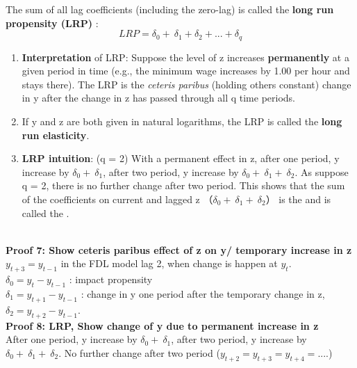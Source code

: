 \documentclass[12pt]{article}
\begin{document}
\noindent
The sum of all lag coefficients (including the zero-lag) is called the \textbf{long run propensity (LRP) }:
\begin{equation}
LRP=\delta_0 +\ \delta_1+\delta_2 +...+\delta_q 
\end{equation}
\noindent

\begin{enumerate}
\item 
\textbf{Interpretation} of LRP:
Suppose the level of z increases \textbf{permanently} at a given period in time (e.g., the minimum wage increases by 1.00 per hour and stays there). The LRP is the \textit{ceteris paribus} (holding others constant) change in y after the change in z has passed through all q time periods.

\item
If y and z are both given in natural logarithms, the LRP is called the \textbf{long run elasticity}.

\item
\textbf{LRP intuition}: (q = 2) With a permanent effect in z, after one period, y increase by $\delta_0 +\ \delta_1$, after two period, y increase by $\delta_0 +\ \delta_1+\ \delta_2$. As suppose q = 2, there is no further change after two period. This shows that the sum of the coefficients on current and lagged z （$\delta_0 +\ \delta_1+\ \delta_2$） is the  and is called the . 
\end{enumerate}
\\
{\color{Tan} \textbf{Proof 7: Show ceteris paribus effect of z on y/ temporary increase in z}}\\
$y_{t+3} = y_{t-1}$ in the FDL model lag 2, when change is happen at $y_t$. \\
$\delta_0 = y_t - y_{t-1}$ : impact propensity\\
$\delta_1 = y_{t+1} - y_{t-1}$ : change in y one period after the temporary change in z, $\delta_2 = y_{t+2} - y_{t-1}$. 
\\

\noindent
{\color{Tan} \textbf{Proof 8: LRP, Show change of y due to permanent increase in z}}\\
After one period, y increase by $\delta_0 +\ \delta_1$, after two period, y increase by $\delta_0 +\ \delta_1+\ \delta_2$. No further change after two period ($y_{t+2} = y_{t+3} = y_{t+4} = .... $)
\\
\end{document}
